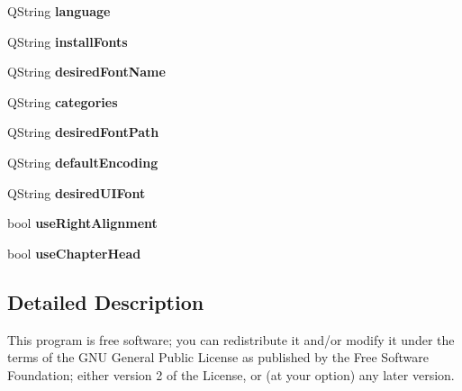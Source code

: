 \begin{DoxyCompactItemize}
\item 
\hypertarget{structStructModuleProperties_afb40a3359257dc9525084a601646c73e}{
QString {\bfseries language}}
\label{structStructModuleProperties_afb40a3359257dc9525084a601646c73e}

\item 
\hypertarget{structStructModuleProperties_ad740c5761c1ed7cfe5a7ebd460094170}{
QString {\bfseries installFonts}}
\label{structStructModuleProperties_ad740c5761c1ed7cfe5a7ebd460094170}

\item 
\hypertarget{structStructModuleProperties_a4d5bf20a5ac97b8b6befb2acefd62181}{
QString {\bfseries desiredFontName}}
\label{structStructModuleProperties_a4d5bf20a5ac97b8b6befb2acefd62181}

\item 
\hypertarget{structStructModuleProperties_a794ac064df54b0b4b42b7addfb6ee5e2}{
QString {\bfseries categories}}
\label{structStructModuleProperties_a794ac064df54b0b4b42b7addfb6ee5e2}

\item 
\hypertarget{structStructModuleProperties_a97863aa9f9e64a4f4410bb72025792d6}{
QString {\bfseries desiredFontPath}}
\label{structStructModuleProperties_a97863aa9f9e64a4f4410bb72025792d6}

\item 
\hypertarget{structStructModuleProperties_a8766bbd00448a67b6fbd080515d283c5}{
QString {\bfseries defaultEncoding}}
\label{structStructModuleProperties_a8766bbd00448a67b6fbd080515d283c5}

\item 
\hypertarget{structStructModuleProperties_a4ebecbb66fc2560ac2d0dff5d98a8a33}{
QString {\bfseries desiredUIFont}}
\label{structStructModuleProperties_a4ebecbb66fc2560ac2d0dff5d98a8a33}

\item 
\hypertarget{structStructModuleProperties_aed8bb19c1f26fa72466a23c505ecb5c1}{
bool {\bfseries useRightAlignment}}
\label{structStructModuleProperties_aed8bb19c1f26fa72466a23c505ecb5c1}

\item 
\hypertarget{structStructModuleProperties_ab5ced8c8c3245df0bcba63a6988bf02a}{
bool {\bfseries useChapterHead}}
\label{structStructModuleProperties_ab5ced8c8c3245df0bcba63a6988bf02a}

\end{DoxyCompactItemize}


\subsection{Detailed Description}
This program is free software; you can redistribute it and/or modify it under the terms of the GNU General Public License as published by the Free Software Foundation; either version 2 of the License, or (at your option) any later version.

